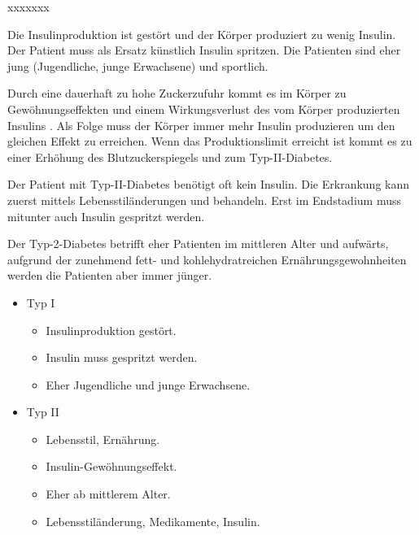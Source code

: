 {
\begin{labeling}[~--]{xxxxxxx }
  \item[Typ I]   Die Insulinproduktion ist gestört und
  der Körper produziert zu wenig Insulin. Der Patient
  muss als Ersatz künstlich Insulin spritzen.  Die Patienten sind eher jung
  (Jugendliche, junge Erwachsene) und sportlich.
  
  
  \item[Typ II]
   Durch eine dauerhaft zu hohe
  Zuckerzufuhr kommt es im Körper zu Gewöhnungseffekten und einem
  Wirkungsverlust des vom Körper produzierten Insulins
  . Als Folge muss der Körper immer mehr Insulin produzieren um den gleichen Effekt zu
  erreichen. Wenn das Produktionslimit erreicht ist kommt es zu
  einer Erhöhung des Blutzuckerspiegels und zum Typ-II-Diabetes.
  
  Der Patient mit Typ-II-Diabetes benötigt oft kein Insulin. Die
  Erkrankung kann zuerst mittels Lebensstiländerungen und
   behandeln. Erst im Endstadium muss mitunter auch Insulin
  gespritzt werden.
  
  Der Typ-2-Diabetes betrifft eher Patienten im mittleren Alter und aufwärts,
  aufgrund der zunehmend fett- und kohlehydratreichen Ernährungsgewohnheiten
  werden die Patienten aber immer jünger.
\end{labeling}
}{
\begin{itemize}
  \item Typ I
  \begin{itemize}
    \item Insulinproduktion gestört.
    \item Insulin muss gespritzt werden.
    \item Eher Jugendliche und junge Erwachsene.
  \end{itemize}
  \item Typ II
  \begin{itemize}
    \item Lebensstil, Ernährung.
    \item Insulin-Gewöhnungseffekt.
    \item Eher ab mittlerem Alter.
    \item Lebensstiländerung, Medikamente, Insulin.
  \end{itemize}
\end{itemize}
}{}{}{}


